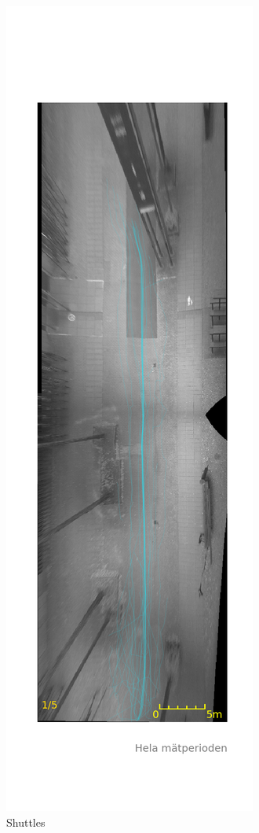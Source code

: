 \documentclass{article}
\begin{document}
\begin{figure}[H]
\begin{subfigure}{.3\textwidth}
  \includegraphics[width=.5\linewidth]{data/Data_3.png}
  \caption{Shuttles}
  \label{fig:shu_tra}
\end{subfigure}
\begin{subfigure}{.3\textwidth}
  \centering

\end{subfigure}
\end{figure}
\end{document}
